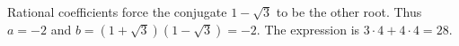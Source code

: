 Rational coefficients force the conjugate $1-\sqrt3$ to be the other root. Thus $a=-2$ and $b=(1+\sqrt3)(1-\sqrt3)=-2$. The expression is $3\cdot4+4\cdot4=\boxed{28}$.
